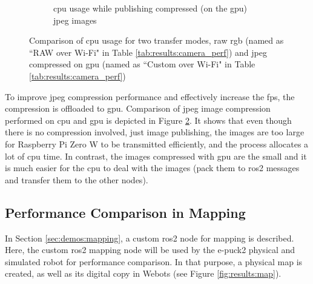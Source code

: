 \begin{figure}[H]
\begin{subfigure}{.8\textwidth}
  \caption{\ac{cpu} usage while publishing compressed (on the \ac{gpu}) \ac{jpeg} images}
  \label{fig:results:camera_load:jpeg_gpu}
\end{subfigure}
\caption[Comparison of \ac{cpu} usage for two transfer modes, raw \ac{rgb} and \ac{jpeg} compressed on \ac{gpu}]{Comparison of \ac{cpu} usage for two transfer modes, raw \ac{rgb} (named as ``RAW over Wi-Fi" in Table \ref{tab:results:camera_perf}) and \ac{jpeg} compressed on \ac{gpu} (named as ``Custom over Wi-Fi" in Table \ref{tab:results:camera_perf})}
\label{fig:results:camera_load}
\end{figure}

To improve \ac{jpeg} compression performance and effectively increase the \ac{fps}, the compression is offloaded to \ac{gpu}.
Comparison of \ac{jpeg} image compression performed on \ac{cpu} and \ac{gpu} is depicted in Figure \ref{fig:results:camera_load}.
It shows that even though there is no compression involved, just image publishing, the images are too large for Raspberry Pi Zero W to be transmitted efficiently, and the process allocates a lot of \ac{cpu} time.
In contrast, the images compressed with \ac{gpu} are the small and it is much easier for the \ac{cpu} to deal with the images (pack them to \ac{ros2} messages and transfer them to the other nodes).

\subsection{Performance Comparison in Mapping}
In Section \ref{sec:demos:mapping}, a custom \ac{ros2} node for mapping is described. Here, the custom \ac{ros2} mapping node will be used by the e-puck2 physical and simulated robot for performance comparison.
In that purpose, a physical map is created, as well as its digital copy in Webots (see Figure \ref{fig:results:map}).

